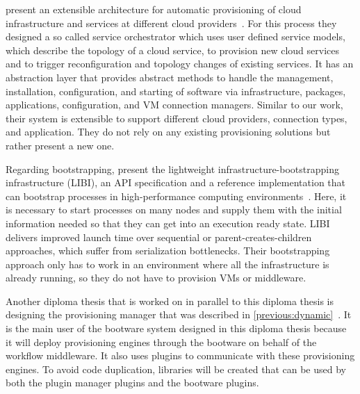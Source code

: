 \citeauthor*{provisioning:architecture} present an extensible architecture for automatic provisioning of cloud infrastructure and services at different cloud providers~\autocite{provisioning:architecture}.
For this process they designed a so called service orchestrator which uses user defined service models, which describe the topology of a cloud service, to provision new cloud services and to trigger reconfiguration and topology changes of existing services.
It has an abstraction layer that provides abstract methods to handle the management, installation, configuration, and starting of software via infrastructure, packages, applications, configuration, and VM connection managers.
Similar to our work, their system is extensible to support different cloud providers, connection types, and application.
They do not rely on any existing provisioning solutions but rather present a new one.

Regarding bootstrapping, \citeauthor*{libi} present the lightweight infrastructure-bootstrapping infrastructure (LIBI), an API specification and a reference implementation that can bootstrap processes in high-performance computing environments~\autocite{libi}.
Here, it is necessary to start processes on many nodes and supply them with the initial information needed so that they can get into an execution ready state.
LIBI delivers improved launch time over sequential or parent-creates-children approaches, which suffer from serialization bottlenecks.
Their bootstrapping approach only has to work in an environment where all the infrastructure is already running, so they do not have to provision VMs or middleware.

Another diploma thesis that is worked on in parallel to this diploma thesis is designing the provisioning manager that was described in \autoref{previous:dynamic}~\autocite{nedim}.
It is the main user of the bootware system designed in this diploma thesis because it will deploy provisioning engines through the bootware on behalf of the workflow middleware.
It also uses plugins to communicate with these provisioning engines.
To avoid code duplication, libraries will be created that can be used by both the plugin manager plugins and the bootware plugins.
